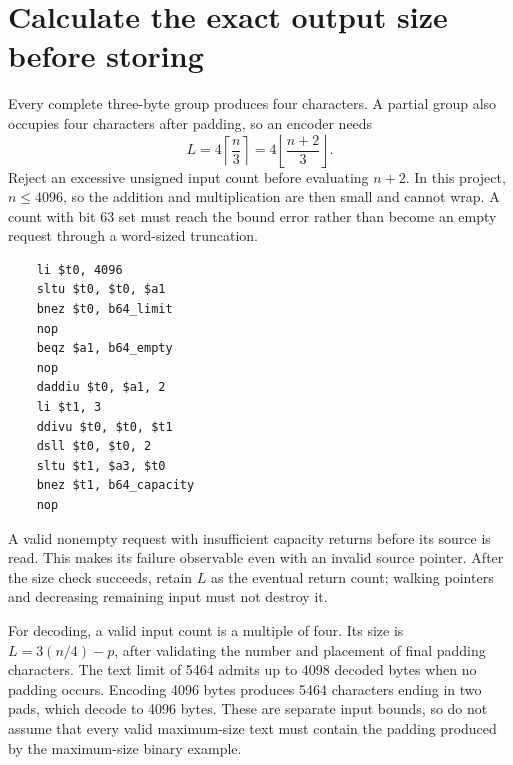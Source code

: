 \section{Calculate the exact output size before storing}
Every complete three-byte group produces four characters. A partial group also occupies
four characters after padding, so an encoder needs
\[
L=4\left\lceil\frac n3\right\rceil
 =4\left\lfloor\frac{n+2}{3}\right\rfloor.
\]
Reject an excessive unsigned input count before evaluating \(n+2\). In this project,
\(n\le4096\), so the addition and multiplication are then small and cannot wrap.
A count with bit 63 set must reach the bound error rather than become an empty request
through a word-sized truncation.

\begin{verbatim}
    li $t0, 4096
    sltu $t0, $t0, $a1
    bnez $t0, b64_limit
    nop
    beqz $a1, b64_empty
    nop
    daddiu $t0, $a1, 2
    li $t1, 3
    ddivu $t0, $t0, $t1
    dsll $t0, $t0, 2
    sltu $t1, $a3, $t0
    bnez $t1, b64_capacity
    nop
\end{verbatim}

A valid nonempty request with insufficient capacity returns before its source is read.
This makes its failure observable even with an invalid source pointer. After the size
check succeeds, retain \(L\) as the eventual return count; walking pointers and decreasing
remaining input must not destroy it.

For decoding, a valid input count is a multiple of four. Its size is
\(L=3(n/4)-p\), after validating the number and placement of final padding characters.
The text limit of 5464 admits up to 4098 decoded bytes when no padding occurs. Encoding
4096 bytes produces 5464 characters ending in two pads, which decode to 4096 bytes.
These are separate input bounds, so do not assume that every valid maximum-size text
must contain the padding produced by the maximum-size binary example.

